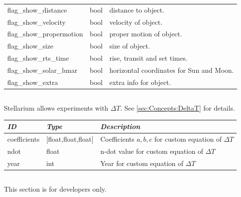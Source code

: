 \begin{longtable}{l|l|l}
flag\_show\_distance          & bool & distance to object.\\
flag\_show\_velocity          & bool & velocity of object.\\
flag\_show\_propermotion      & bool & proper motion of object.\\
flag\_show\_size              & bool & size of object.\\
flag\_show\_rts\_time         & bool & rise, transit and set times.\\
flag\_show\_solar\_lunar      & bool & horizontal coordinates for Sun and Moon.\\
flag\_show\_extra             & bool & extra info for object.\\\bottomrule
\end{longtable}

\subsection{}

Stellarium allows experiments with $\Delta T$. See \ref{sec:Concepts:DeltaT} for details.

\noindent%
\begin{tabularx}{\textwidth}{l|l|X}\toprule
\emph{ID}    & \emph{Type} & \emph{Description}\\\midrule
coefficients & [float,float,float] & Coefficients $a, b, c$ for custom equation of $\Delta T$\\%
ndot & float & n-dot value for custom equation of $\Delta T$\\%
year & int   & Year for custom equation of $\Delta T$\\\bottomrule
\end{tabularx}

\subsection{}

This section is for developers only. 

